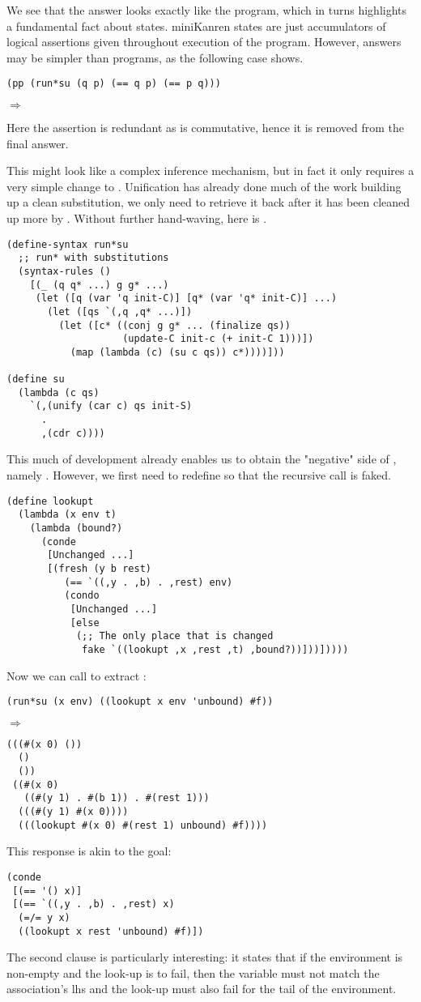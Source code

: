 We see that the answer looks exactly like the program, which in turns highlights a fundamental fact about states. miniKanren states are just accumulators of logical assertions given throughout execution of the program. However, answers may be simpler than programs, as the following case shows.
\begin{lstlisting}
(pp (run*su (q p) (== q p) (== p q)))
\end{lstlisting}
$\Rightarrow$ 

Here the assertion  is redundant as \code{==} is commutative, hence it is removed from the final answer.

This might look like a complex inference mechanism, but in fact it only requires a very simple change to . Unification has already done much of the work building up a clean substitution, we only need to retrieve it back after it has been cleaned up more by . Without further hand-waving, here is .
\begin{lstlisting}
(define-syntax run*su
  ;; run* with substitutions
  (syntax-rules ()
    [(_ (q q* ...) g g* ...)
     (let ([q (var 'q init-C)] [q* (var 'q* init-C)] ...)
       (let ([qs `(,q ,q* ...)])
         (let ([c* ((conj g g* ... (finalize qs))
                    (update-C init-c (+ init-C 1)))])
           (map (lambda (c) (su c qs)) c*))))]))

(define su
  (lambda (c qs)
    `(,(unify (car c) qs init-S)
      .
      ,(cdr c))))
\end{lstlisting}

This much of development already enables us to obtain the "negative" side of , namely . However, we first need to redefine  so that the recursive call is faked.
\begin{lstlisting}
(define lookupt
  (lambda (x env t)
    (lambda (bound?)
      (conde
       [Unchanged ...]
       [(fresh (y b rest)
          (== `((,y . ,b) . ,rest) env)
          (condo
           [Unchanged ...]
           [else
            (;; The only place that is changed
             fake `((lookupt ,x ,rest ,t) ,bound?))]))]))))
\end{lstlisting}

Now we can call  to extract : 
\begin{lstlisting}
(run*su (x env) ((lookupt x env 'unbound) #f))
\end{lstlisting}
$\Rightarrow$
\begin{lstlisting}
(((#(x 0) ()) 
  () 
  ())
 ((#(x 0) 
   ((#(y 1) . #(b 1)) . #(rest 1)))
  (((#(y 1) #(x 0))))
  (((lookupt #(x 0) #(rest 1) unbound) #f))))
\end{lstlisting}
This response is akin to the goal:
\begin{lstlisting}
(conde
 [(== '() x)]
 [(== `((,y . ,b) . ,rest) x)
  (=/= y x)
  ((lookupt x rest 'unbound) #f)])
\end{lstlisting}
The second clause is particularly interesting: it states that if the environment is non-empty and the look-up is to fail, then the variable  must not match the association's lhs and the look-up must also fail for the tail of the environment.

